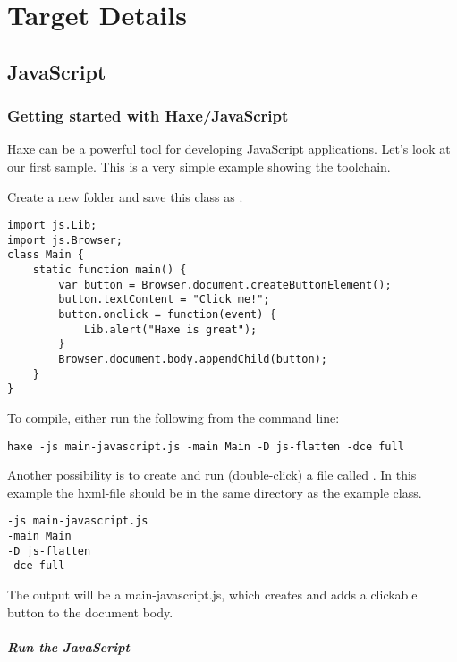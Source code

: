 \chapter{Target Details}
\label{target-details}

\section{JavaScript}
\label{target-javascript}

\subsection{Getting started with Haxe/JavaScript}
\label{target-javascript-getting-started}

Haxe can be a powerful tool for developing JavaScript applications. Let's look at our first sample.
This is a very simple example showing the toolchain. 

Create a new folder and save this class as .

\begin{lstlisting}
import js.Lib;
import js.Browser;
class Main {
    static function main() {
        var button = Browser.document.createButtonElement();
        button.textContent = "Click me!";
        button.onclick = function(event) {
            Lib.alert("Haxe is great");
        }
        Browser.document.body.appendChild(button);
    }
}
\end{lstlisting}

To compile, either run the following from the command line:

\begin{lstlisting}
haxe -js main-javascript.js -main Main -D js-flatten -dce full
\end{lstlisting}

Another possibility is to create and run (double-click) a file called . In this example the hxml-file should be in the same directory as the example class.

\begin{lstlisting}
-js main-javascript.js
-main Main
-D js-flatten
-dce full
\end{lstlisting}

The output will be a main-javascript.js, which creates and adds a clickable button to the document body.

\paragraph{Run the JavaScript}

